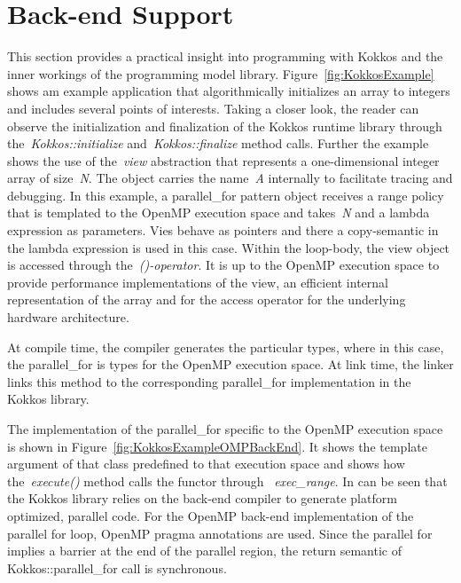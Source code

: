 \section{Back-end Support}\label{chap:kokkosBackend}

This section provides a practical insight into programming with Kokkos and the inner workings of the programming model library. Figure~\ref{fig:KokkosExample} shows am example application that algorithmically initializes an array to integers and includes several points of interests. Taking a closer look, the reader can observe the initialization and finalization of the Kokkos runtime library through the~\emph{Kokkos::initialize} and~\emph{Kokkos::finalize} method calls. Further the example shows the use of the~\emph{view} abstraction that represents a one-dimensional integer array of size~\emph{N}. The object carries the name~\emph{A} internally to facilitate tracing and debugging. In this example, a parallel\_for pattern object receives a range policy that is templated to the OpenMP execution space and takes~\emph{N} and a lambda expression as parameters. Vies behave as pointers and there a copy-semantic in the lambda expression is used in this case. Within the loop-body, the view object is accessed through the~\emph{()-operator}. It is up to the OpenMP execution space to provide performance implementations of the view, an efficient internal representation of the array and for the access operator for the underlying hardware architecture.

At compile time, the compiler generates the particular types, where in this case, the parallel\_for is types for the OpenMP execution space. At link time, the linker links this method to the corresponding parallel\_for implementation in the Kokkos library.

The implementation of the parallel\_for specific to the OpenMP execution space is shown in Figure~\ref{fig:KokkosExampleOMPBackEnd}. It shows the template argument of that class predefined to that execution space and shows how the~\emph{execute()} method calls the functor through ~\emph{exec\_range}. In can be seen that the Kokkos library relies on the back-end compiler to generate platform optimized, parallel code. For the OpenMP back-end implementation of the parallel for loop, OpenMP pragma annotations are used. Since the parallel for implies a barrier at the end of the parallel region, the return semantic of Kokkos::parallel\_for call is synchronous. 


